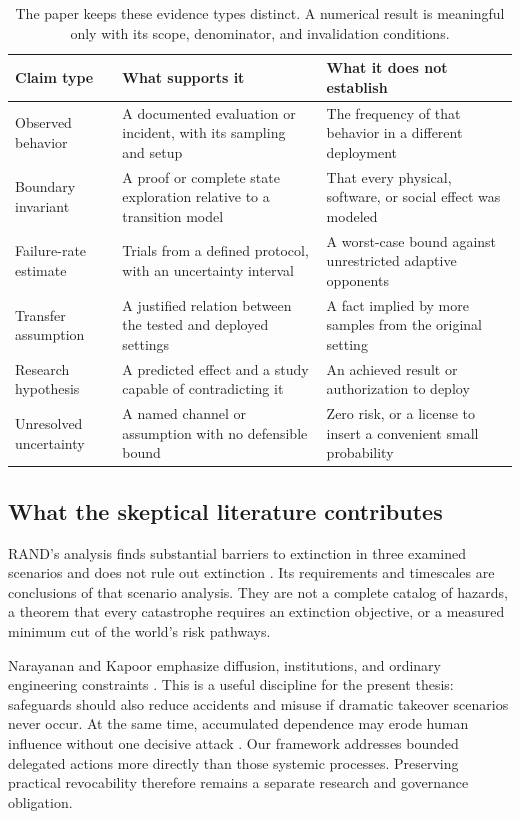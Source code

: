 \begin{table}[t]
\centering\small
\begin{tabularx}{\textwidth}{@{}P{.18\textwidth}LL@{}}
\toprule
\textbf{Claim type} & \textbf{What supports it} & \textbf{What it does not establish}\\
\midrule
Observed behavior & A documented evaluation or incident, with its sampling and setup & The frequency of that behavior in a different deployment\\
Boundary invariant & A proof or complete state exploration relative to a transition model & That every physical, software, or social effect was modeled\\
Failure-rate estimate & Trials from a defined protocol, with an uncertainty interval & A worst-case bound against unrestricted adaptive opponents\\
Transfer assumption & A justified relation between the tested and deployed settings & A fact implied by more samples from the original setting\\
Research hypothesis & A predicted effect and a study capable of contradicting it & An achieved result or authorization to deploy\\
Unresolved uncertainty & A named channel or assumption with no defensible bound & Zero risk, or a license to insert a convenient small probability\\
\bottomrule
\end{tabularx}
\caption{The paper keeps these evidence types distinct. A numerical result is meaningful only with its scope, denominator, and invalidation conditions.}
\label{tab:claims}
\end{table}

\subsection{What the skeptical literature contributes}
RAND's analysis finds substantial barriers to extinction in three examined scenarios and does not rule out extinction \cite{rand}. Its requirements and timescales are conclusions of that scenario analysis. They are not a complete catalog of hazards, a theorem that every catastrophe requires an extinction objective, or a measured minimum cut of the world's risk pathways.

Narayanan and Kapoor emphasize diffusion, institutions, and ordinary engineering constraints \cite{normal}. This is a useful discipline for the present thesis: safeguards should also reduce accidents and misuse if dramatic takeover scenarios never occur. At the same time, accumulated dependence may erode human influence without one decisive attack \cite{gradual}. Our framework addresses bounded delegated actions more directly than those systemic processes. Preserving practical revocability therefore remains a separate research and governance obligation.
